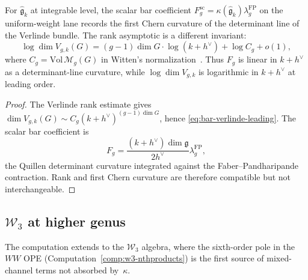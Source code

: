 \begin{proposition}
\label{prop:bar-verlinde-asymptotics}
For $\widehat{\mathfrak{g}}_k$ at integrable level, the scalar
bar coefficient
$F_g^{\mathrm{sc}}
=\kappa(\widehat{\mathfrak{g}}_k)\lambda_g^{\mathrm{FP}}$
on the uniform-weight lane records the first Chern
curvature of the determinant line of the Verlinde bundle. The
rank asymptotic is a different invariant:
\begin{equation}\label{eq:bar-verlinde-leading}
\log \dim V_{g,k}(G)
= (g-1)\dim G\cdot\log(k+h^\vee)+\log C_g+o(1),
\end{equation}
where $C_g=\mathrm{Vol}\,\mathcal{M}_g(G)$ in Witten's
normalization~\cite{Witten91}. Thus $F_g$ is linear in
$k+h^\vee$ as a determinant-line curvature, while
$\log\dim V_{g,k}$ is logarithmic in $k+h^\vee$ at leading order.
\end{proposition}

\begin{proof}
The Verlinde rank estimate gives
$\dim V_{g,k}(G)\sim C_g(k+h^\vee)^{(g-1)\dim G}$, hence
\eqref{eq:bar-verlinde-leading}. The scalar bar coefficient is
\[
F_g
=\frac{(k+h^\vee)\dim\mathfrak g}{2h^\vee}
\lambda_g^{\mathrm{FP}},
\]
the Quillen determinant curvature integrated against the
Faber--Pandharipande contraction. Rank and first Chern curvature
are therefore compatible but not interchangeable.
\end{proof}

\subsection{\texorpdfstring{$\mathcal{W}_3$ at higher genus}{W3 at higher genus}}\label{subsec:w3-higher-genus}

The computation extends to the $\mathcal{W}_3$ algebra, where the
sixth-order pole in the $WW$ OPE (Computation~\ref{comp:w3-nthproducts})
is the first source of mixed-channel terms not absorbed by~$\kappa$.

